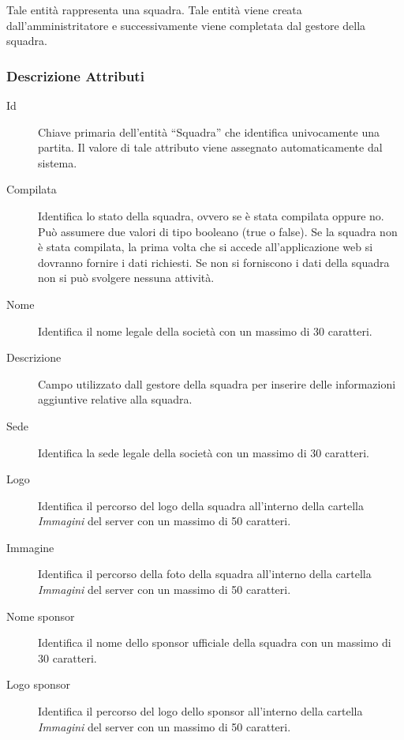 		Tale entità rappresenta una squadra. Tale entità viene creata dall'amministritatore e successivamente viene completata dal gestore della squadra.
		
		\subsubsection*{Descrizione Attributi}
		
		\begin{description}
			
			\item[Id]
			Chiave primaria dell'entità ``Squadra'' che identifica univocamente una partita. Il valore di tale attributo viene assegnato automaticamente dal sistema.
			
			\item[Compilata]
			Identifica lo stato della squadra, ovvero se è stata compilata oppure no. Può assumere due valori di tipo booleano (true o false). Se la squadra non è stata compilata, la prima volta che si accede all'applicazione web si dovranno fornire i dati richiesti. Se non si forniscono i dati della squadra non si può svolgere nessuna attività.
			
			\item[Nome]
			Identifica il nome legale della società con un massimo di 30 caratteri.
			
			\item[Descrizione]
			Campo utilizzato dall gestore della squadra per inserire delle informazioni aggiuntive relative alla squadra.
			
			\item[Sede]
			Identifica la sede legale della società con un massimo di 30 caratteri.
			
			\item[Logo]
			Identifica il percorso del logo della squadra all'interno della cartella \emph{Immagini} del server con un massimo di 50 caratteri.
			
			\item[Immagine]
			Identifica il percorso della foto della squadra all'interno della cartella \emph{Immagini} del server con un massimo di 50 caratteri.
			
			\item[Nome sponsor]
			Identifica il nome dello sponsor ufficiale della squadra con un massimo di 30 caratteri.
			
			\item[Logo sponsor]
			Identifica il percorso del logo dello sponsor all'interno della cartella \emph{Immagini} del server con un massimo di 50 caratteri.
			
		\end{description}
		
